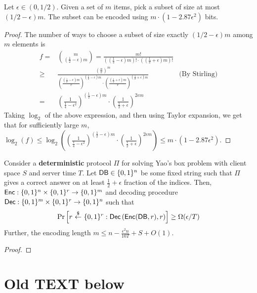 \begin{fact}
Let $\epsilon \in (0, 1/2)$. 
Given a set of $m$ items, 
pick a subset of size at most $(1/2 - \epsilon)m$. 
The subset 
can be encoded using $m \cdot (1- 2.87 \epsilon^2)$ bits. 
\end{fact}
\begin{proof}
The number of ways to choose  
a subset of size exactly $(1/2 - \epsilon)m$
among $m$ elements is 
\begin{align*}
 f = & {m \choose (\frac12 - \epsilon)m }
= \frac{m!}{\left((\frac12 - \epsilon)m\right)! \cdot \left((\frac12 + \epsilon)m\right)!}\\
 \geq & \frac{\left(\frac{n}{e}\right)^m}{\left(\frac{(\frac12-\epsilon)m}{e}
\right)^{(\frac12-\epsilon)m} \cdot \left(\frac{(\frac12+\epsilon)m}{e}
\right)^{(\frac12+\epsilon)m}} & \text{(By Stirling)}\\  
 = & \left(\frac{1}{\frac14- \epsilon^2}\right)^{(\frac12 - \epsilon)m} 
\cdot 
\left(\frac{1}{\frac12 + \epsilon}\right)^{2\epsilon m}
\end{align*}
Taking $\log_2 $ of the 
above expression, 
and then using Taylor expansion, we get that 
for sufficiently large $m$, 
$\log_2(f) \leq 
\log_2\left(
\left(\frac{1}{\frac14- \epsilon^2}\right)^{(\frac12 - \epsilon)m}
\cdot
\left(\frac{1}{\frac12 + \epsilon}\right)^{2\epsilon m}
\right) \leq m \cdot (1 - 2.87\epsilon^2)$.
\end{proof}


\begin{lemma}
Consider a {\bf deterministic}
protocol $\Pi$ for solving Yao's box problem with 
client space $S$ and server time $T$. 
Let ${\sf DB} \in \{0, 1\}^n$ be some fixed string 
such that 
$\Pi$ gives a correct answer
on  
at least $\frac{1}{2} + \epsilon$ 
fraction of the indices.
Then, 
${\sf Enc}: \{0, 1\}^n \times \{0, 1\}^r \rightarrow \{0, 1\}^m$
and decoding procedure
${\sf Dec}: \{0, 1\}^m \times \{0, 1\}^r \rightarrow \{0, 1\}^n$
such that
\[
\Pr\left[r ~{\overset{\$}{\leftarrow}}~ \{0, 1\}^r: 
{\sf Dec}\left({\sf Enc}({\sf DB}, r), r\right) 
\right]
\geq 
\Omega(\epsilon/T)
\]
Further, the encoding length 
$m \leq n - \frac{\epsilon^2 n}{10T} + S + O(1)$.
\end{lemma}
\begin{proof}
\end{proof}


\section*{Old TEXT below}
\vspace{5mm}

